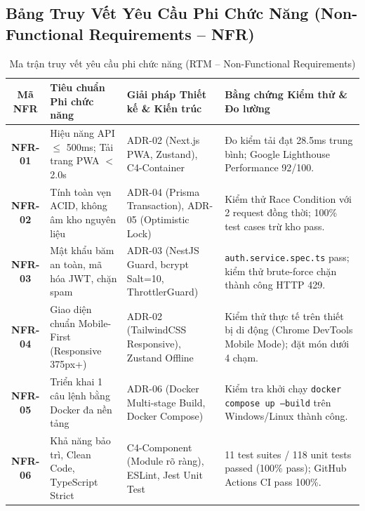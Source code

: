 \documentclass[11pt,a4paper]{article}
\begin{document}
\subsection{Bảng Truy Vết Yêu Cầu Phi Chức Năng (Non-Functional Requirements -- NFR)}
\vspace{-0.15cm}
\begin{table}[H]
\centering
\scriptsize
\renewcommand{\arraystretch}{0.75}
\begin{tabularx}{\linewidth}{|c|p{2.8cm}|p{3.0cm}|Y|}
\hline
{}
\textbf{Mã NFR} & \textbf{Tiêu chuẩn Phi chức năng} & \textbf{Giải pháp Thiết kế \& Kiến trúc} & \textbf{Bằng chứng Kiểm thử \& Đo lường} \\ \hline
\textbf{NFR-01} & Hiệu năng API $\le$ 500ms; Tải trang PWA $<$ 2.0s & ADR-02 (Next.js PWA, Zustand), C4-Container & Đo kiểm tải đạt 28.5ms trung bình; Google Lighthouse Performance 92/100. \\ \hline
\textbf{NFR-02} & Tính toàn vẹn ACID, không âm kho nguyên liệu & ADR-04 (Prisma Transaction), ADR-05 (Optimistic Lock) & Kiểm thử Race Condition với 2 request đồng thời; 100\% test cases trừ kho pass. \\ \hline
\textbf{NFR-03} & Mật khẩu băm an toàn, mã hóa JWT, chặn spam & ADR-03 (NestJS Guard, bcrypt Salt=10, ThrottlerGuard) & \texttt{auth.service.spec.ts} pass; kiểm thử brute-force chặn thành công HTTP 429. \\ \hline
\textbf{NFR-04} & Giao diện chuẩn Mobile-First (Responsive 375px+) & ADR-02 (TailwindCSS Responsive), Zustand Offline & Kiểm thử thực tế trên thiết bị di động (Chrome DevTools Mobile Mode); đặt món dưới 4 chạm. \\ \hline
\textbf{NFR-05} & Triển khai 1 câu lệnh bằng Docker đa nền tảng & ADR-06 (Docker Multi-stage Build, Docker Compose) & Kiểm tra khởi chạy \texttt{docker compose up --build} trên Windows/Linux thành công. \\ \hline
\textbf{NFR-06} & Khả năng bảo trì, Clean Code, TypeScript Strict & C4-Component (Module rõ ràng), ESLint, Jest Unit Test & 11 test suites / 118 unit tests passed (100\% pass); GitHub Actions CI pass 100\%. \\ \hline
\end{tabularx}
\caption{Ma trận truy vết yêu cầu phi chức năng (RTM -- Non-Functional Requirements)}
\label{tab:rtm_nfr}
\end{table}
\vspace{-0.25cm}
\end{document}
